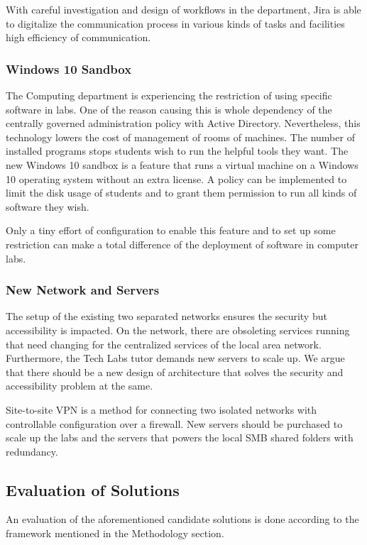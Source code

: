 With careful investigation and design of workflows in the department, Jira is able to digitalize the communication process in various kinds of tasks and facilities high efficiency of communication.

\subsubsection{Windows 10 Sandbox}
The Computing department is experiencing the restriction of using specific software in labs. One of the reason causing this is whole dependency of the centrally governed administration policy with Active Directory. Nevertheless, this technology lowers the cost of management of rooms of machines. The number of installed programs stops students wish to run the helpful tools they want. The new Windows 10 sandbox is a feature that runs a virtual machine on a Windows 10 operating system without an extra license. A policy can be implemented to limit the disk usage of students and to grant them permission to run all kinds of software they wish.

Only a tiny effort of configuration to enable this feature and to set up some restriction can make a total difference of the deployment of software in computer labs.

\subsubsection{New Network and Servers}
The setup of the existing two separated networks ensures the security but accessibility is impacted. On the network, there are obsoleting services running that need changing for the centralized services of the local area network. Furthermore, the Tech Labs tutor demands new servers to scale up. We argue that there should be a new design of architecture that solves the security and accessibility problem at the same.

Site-to-site VPN is a method for connecting two isolated networks with controllable configuration over a firewall. New servers should be purchased to scale up the labs and the servers that powers the local SMB shared folders with redundancy.

\subsection{Evaluation of Solutions}
An evaluation of the aforementioned candidate solutions is done according to the framework mentioned in the Methodology section.

